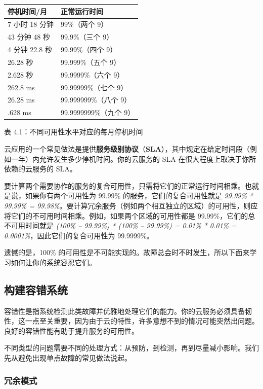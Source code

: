 \begin{center}
\begin{tabularx}{\textwidth}{XX}
\toprule
\textbf{停机时间/月} & \textbf{正常运行时间} \\
\midrule
7 小时 18 分钟 & 99\%（两个 9） \\
43 分钟 48 秒 & 99.9\%（三个 9） \\
4 分钟 22.8 秒 & 99.99\%（四个 9） \\
26.28 秒 & 99.999\%（五个 9） \\
2.628 秒 & 99.9999\%（六个 9） \\
262.8 ms & 99.99999\%（七个 9） \\
26.28 ms & 99.999999\%（八个 9） \\
.628 ms & 99.9999999\%（九个 9） \\
\bottomrule
\end{tabularx}
\end{center}

表 4.1：不同可用性水平对应的每月停机时间

\label{idx:310}
云应用的一个常见做法是提供\textbf{服务级别协议}（\textbf{SLA}），其中规定在给定时间段（例如一年）内允许发生多少停机时间。你的云服务的 SLA 在很大程度上取决于你所依赖的云服务的 SLA。

要计算两个需要协作的服务的复合可用性，只需将它们的正常运行时间相乘。也就是说，如果你有两个可用性为 99.99\% 的服务，它们的复合可用性就是 \emph{99.99\% * 99.99\% = 99.98\%}。要计算冗余服务（例如两个相互独立的区域）的可用性，则应将它们的不可用时间相乘。例如，如果两个区域的可用性都是 99.99\%，它们的总不可用时间就是 \emph{(100\% – 99.99\%) * (100\% – 99.99\%) = 0.01\% * 0.01\% = 0.0001\%}，因此它们的复合可用性为 99.9999\%。

\label{idx:311}
遗憾的是，100\% 的可用性是不可能实现的。故障总会时不时发生，所以下面来学习如何让你的系统容忍它们。

\subsection{构建容错系统}

\label{idx:312}
容错性是指系统检测此类故障并优雅地处理它们的能力。你的云服务必须具备韧性，这一点至关重要，因为由于云的特性，许多意想不到的情况可能突然出问题。良好的容错性能有助于提升服务的可用性。

不同类型的问题需要不同的处理方式：从预防，到检测，再到尽量减小影响。我们先从避免出现单点故障的常见做法说起。

\subsubsection{冗余模式}

